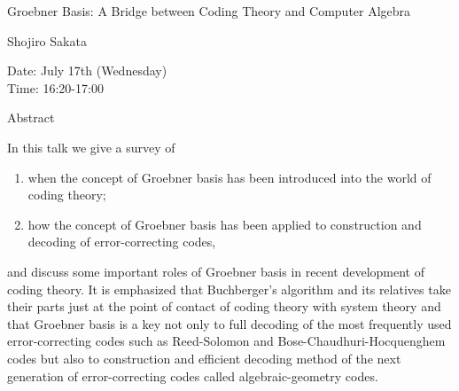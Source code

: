 \begin{center}
\LARGE
Groebner Basis: A Bridge between Coding Theory and Computer Algebra
\end{center}

\begin{center}
\Large
Shojiro Sakata
\end{center}

\noindent
Date:  July 17th (Wednesday)\\
Time:  16:20-17:00 \\

\begin{center}
\large
Abstract
\end{center}

In this talk we give a survey of 
\begin{enumerate}
\item
when the concept of Groebner basis has been introduced into the world of coding theory; 
\item
how the concept of Groebner basis has been applied to construction and decoding of
    error-correcting codes,
\end{enumerate}
and discuss some important roles of Groebner basis in recent development of coding theory. It is
emphasized that Buchberger's algorithm and its relatives take their parts just at the point of contact
of coding theory with system theory and that Groebner basis is a key not only to full decoding of
the most frequently used error-correcting codes such as Reed-Solomon and
Bose-Chaudhuri-Hocquenghem codes but also to construction and efficient decoding method of
the next generation of error-correcting codes called algebraic-geometry codes. 


